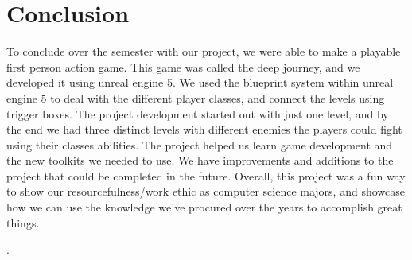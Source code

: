 \documentclass{sigchi}
\begin{document}
\section{Conclusion}
To conclude over the semester with our project, we were able to make a playable first person action game. This game was called the deep journey, and we developed it using unreal engine 5. We used the blueprint system within unreal engine 5 to deal with the different player classes, and connect the levels using trigger boxes. The project development started out with just one level, and by the end we had three distinct levels with different enemies the players could fight using their classes abilities. The project helped us learn game development and the new toolkits we needed to use. We have improvements and additions to the project that could be completed in the future. Overall, this project was a fun way to show our resourcefulness/work ethic as computer science majors, and showcase how we can use the knowledge we've procured over the years to accomplish great things.




%
%
%
%
%
\balance{}




\cite{unrealweb}. \cite{wizard} \cite{infinityw} \cite{infinitya} \cite{AI}  \cite{Timer} \cite{health}


\balance{}




\end{document}
